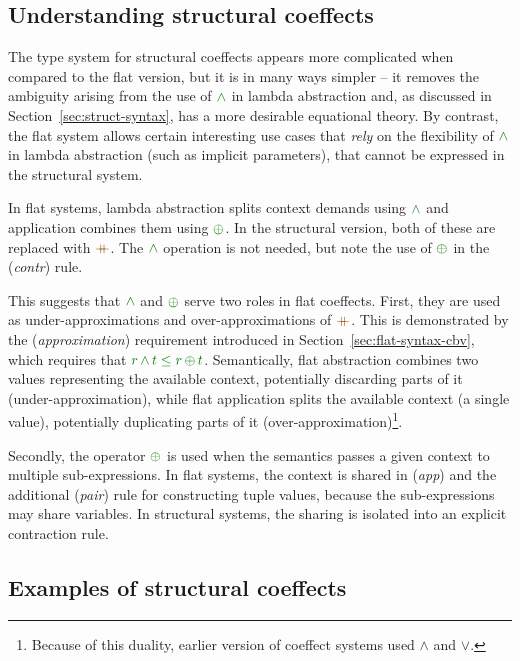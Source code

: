\subsection{Understanding structural coeffects}

The type system for structural coeffects appears more complicated when compared to the flat
version, but it is in many ways simpler -- it removes the ambiguity arising from the use
of $\czip$ in lambda abstraction and, as discussed in Section~\ref{sec:struct-syntax}, has
a more desirable equational theory. By contrast, the flat system allows certain interesting
use cases that \emph{rely} on the flexibility of $\czip$ in lambda abstraction (such as implicit
parameters), that cannot be expressed in the structural system.

In flat systems, lambda abstraction splits context demands using $\czip$ and application
combines them using $\cpar$. In the structural version, both of these are replaced with $\atimes$.
The $\czip$ operation is not needed, but note the use of $\cpar$ in the (\emph{contr}) rule.

This suggests that $\czip$ and $\cpar$ serve two roles in flat coeffects. First, they are used
as under-approximations and over-approximations of $\atimes$. This is demonstrated by the
(\emph{approximation}) requirement introduced in Section~\ref{sec:flat-syntax-cbv}, which requires that
$\cclrd{r}\,\czip\,\cclrd{t}\;\cleq\;\cclrd{r}\,\cpar\,\cclrd{t}$. Semantically, flat abstraction
combines two values representing the available context, potentially discarding parts of it
(under-approximation), while flat application splits the available context (a single value),
potentially duplicating parts of it (over-approxi\-mation)\footnote{Because of this duality, earlier
version of coeffect systems \cite{coeffects-icalp13} used $\wedge$ and $\vee$.}.

Secondly, the operator $\cpar$ is used when the semantics passes a given context to multiple
sub-expressions. In flat systems, the context is shared in (\emph{app}) and the additional
(\emph{pair}) rule for constructing tuple values, because the sub-expressions may share variables.
In structural systems, the sharing is isolated into an explicit contraction rule.


\subsection{Examples of structural coeffects}
\label{sec:struct-calculus-examples}

